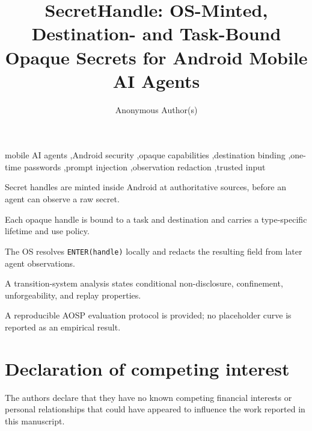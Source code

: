 \documentclass[preprint,12pt]{elsarticle}
\begin{document}
\begin{frontmatter}

\title{SecretHandle: OS-Minted, Destination- and Task-Bound Opaque Secrets for Android Mobile AI Agents}

\author[inst1]{Anonymous Author(s)}

\begin{abstract}

\end{abstract}

\begin{keyword}
mobile AI agents \sep Android security \sep opaque capabilities \sep destination binding \sep one-time passwords \sep prompt injection \sep observation redaction \sep trusted input
\end{keyword}

\end{frontmatter}

\begin{highlights}
\item Secret handles are minted inside Android at authoritative sources, before an agent can observe a raw secret.
\item Each opaque handle is bound to a task and destination and carries a type-specific lifetime and use policy.
\item The OS resolves \texttt{ENTER(handle)} locally and redacts the resulting field from later agent observations.
\item A transition-system analysis states conditional non-disclosure, confinement, unforgeability, and replay properties.
\item A reproducible AOSP evaluation protocol is provided; no placeholder curve is reported as an empirical result.
\end{highlights}














\appendix



\section*{Declaration of competing interest}
The authors declare that they have no known competing financial interests or personal relationships that could have appeared to influence the work reported in this manuscript.
\end{document}
